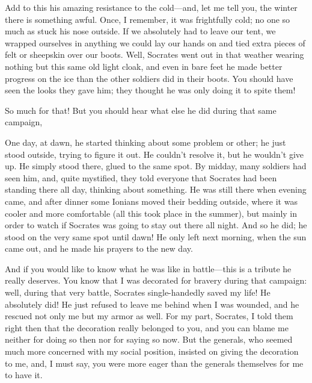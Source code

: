 Add to this his amazing resistance to the cold---and, let me tell you,
the  winter there is something awful. Once, I remember, it was
frightfully cold; no one so much as stuck his nose outside. If we
absolutely had to leave our tent, we wrapped ourselves in anything we
could lay our hands on and tied extra pieces of felt or sheepskin over
our boots. Well, Socrates went out in that weather wearing nothing but
this same old light cloak, and even in bare feet he made better progress
on the ice than the other  soldiers did in their boots. You
should have seen the looks they gave him; they thought he was only doing
it to spite them!

So much for that! But you should hear what else he did during that same
campaign,

\blank[line]


\blank[line]

One day, at dawn, he started thinking about some problem or other; he
just stood outside, trying to figure it out. He couldn’t resolve it, but
he wouldn’t give up. He simply stood there, glued to the same spot. By
midday, many soldiers had seen him, and, quite mystified, they told
everyone that Socrates had been standing there all day, thinking about
something. He was still there when evening came, and after dinner some
Ionians  moved their bedding outside, where it was cooler and
more comfortable (all this took place in the summer), but mainly in
order to watch if Socrates was going to stay out there all night. And so
he did; he stood on the very same spot until dawn! He only left next
morning, when the sun came out, and he made his prayers to the new day.

And if you would like to know what he was like in battle---this is a
tribute he really deserves. You know that I was decorated for bravery
during  that campaign: well, during that very battle, Socrates
single-handedly saved my life! He absolutely did! He just refused to
leave me behind when I was wounded, and he rescued not only me but my
armor as well. For my part, Socrates, I told them right then that the
decoration really belonged to you, and you can blame me neither for
doing so then nor for saying so now. But the generals, who seemed much
more concerned with my social position, insisted on giving the
decoration to me, and, I must say, you were more eager than the generals
themselves for me to have it.

